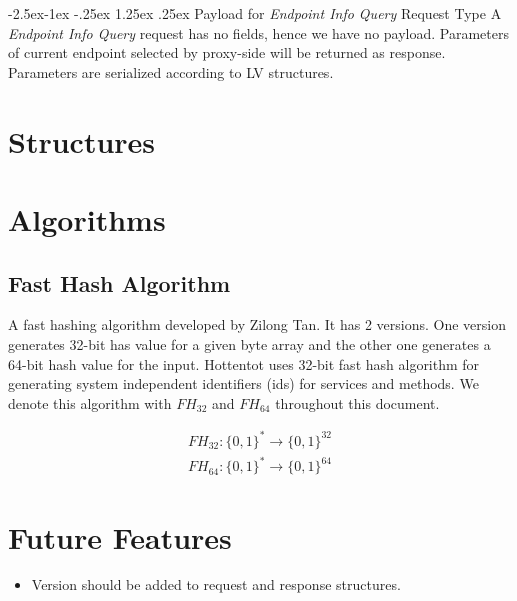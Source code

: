 \documentclass[10pt,a4paper]{article}
\makeatletter
\renewcommand\paragraph{\@startsection{paragraph}{4}{\z@}%
            {-2.5ex\@plus -1ex \@minus -.25ex}%
            {1.25ex \@plus .25ex}%
            {\normalfont\normalsize\bfseries}}
\makeatother
\begin{document}
\paragraph{Payload for \textit{Endpoint Info Query} Request Type} 
A \textit{Endpoint Info Query} request has no fields, hence we have no payload. Parameters of current endpoint selected by proxy-side will be returned as response. Parameters are serialized according to LV structures.

\section{Structures}

\section{Algorithms}

\subsection{Fast Hash Algorithm}
A fast hashing algorithm developed by Zilong Tan. It has 2 versions. One version generates 32-bit has value for a given byte array and the other one generates a 64-bit hash value for the input. Hottentot uses 32-bit fast hash algorithm for generating system independent identifiers (ids) for services and methods. We denote this algorithm with $ FH_{32} $ and $ FH_{64} $ throughout this document.

\begin{equation}
\begin{split}
  FH_{32}: \{0, 1\}^* \to \{0, 1\}^{32}  \\
  FH_{64}: \{0, 1\}^* \to \{0, 1\}^{64}
\end{split}
\end{equation}


\section{Future Features}
\begin{itemize}
  \item Version should be added to request and response structures.
\end{itemize}
\end{document}
